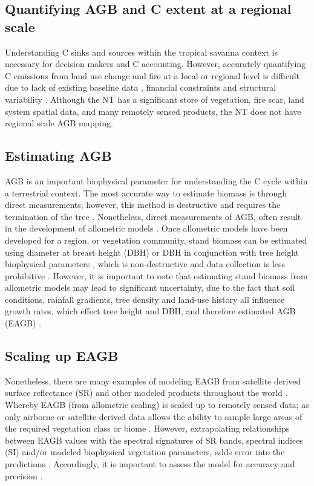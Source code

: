 \subsection{Quantifying AGB and C extent at a regional scale}
Understanding C sinks and sources within the tropical savanna context is necessary for decision makers and C accounting. However, accurately quantifying C emissions from land use change and fire at a local or regional level is difficult due to lack of existing baseline data \citep{woinarski2007}, financial constraints and structural variability \citep{barrettetal2001, houseHall2001}. Although the NT has a significant store of vegetation, fire scar, land system spatial data, and many remotely sensed products, the NT does not have regional scale AGB mapping.

\subsection{Estimating AGB}
AGB is an important biophysical parameter for understanding the C cycle within a terrestrial context. The most accurate way to estimate biomass is through direct measurements; however, this method is destructive and requires the termination of the tree \citep{clarkkellner2012, luetal2014}. Nonetheless, direct measurements of AGB, often result in the development of allometric models \citep{clarkkellner2012, luetal2014}. Once allometric models have been developed for a region, or vegetation community, stand biomass can be estimated using diameter at breast height (DBH) or DBH in conjunction with tree height biophysical parameters \citep{cooketal2005, williamsetal2005b}, which is non-destructive and data collection is less prohibitive \citep{clarkkellner2012, luetal2014}. However, it is important to note that estimating stand biomass from allometric models may lead to significant uncertainty, due to the fact that soil conditions, rainfall gradients, tree density and land-use history all influence growth rates, which effect tree height and DBH, and therefore estimated AGB (EAGB) \citep{clarkkellner2012}.

\subsection{Scaling up EAGB}
Nonetheless, there are many examples of modeling EAGB from satellite derived surface reflectance (SR) and other modeled products throughout the world \citep{gasparretal2010, lietal2020, wuetal2016, wuetal2022, zhengetal2004}. 
Whereby EAGB (from allometric scaling) is scaled up to remotely sensed data; as only airborne or satellite derived data allows the ability to sample large areas of the required vegetation class or biome \citep{clarkkellner2012}. However, extrapolating relationships between EAGB values with the spectral signatures of SR bands, spectral indices (SI) and/or modeled biophysical vegetation parameters, adds error into the predictions \citep{clarkkellner2012}. Accordingly, it is important to assess the model for accuracy and precision \citep{clarkkellner2012}.

